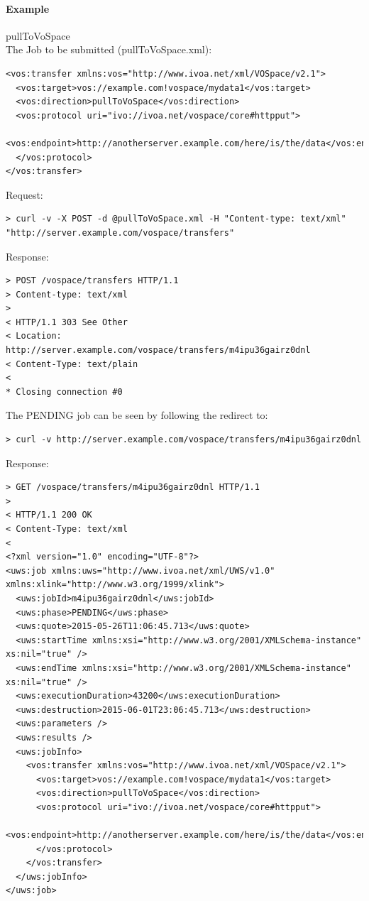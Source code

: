 \documentclass[11pt,a4paper]{ivoa}
\begin{document}
\paragraph{Example}
pullToVoSpace
\\[5px]
\noindent
The Job to be submitted (pullToVoSpace.xml):
\begin{lstlisting}
<vos:transfer xmlns:vos="http://www.ivoa.net/xml/VOSpace/v2.1">
  <vos:target>vos://example.com!vospace/mydata1</vos:target>
  <vos:direction>pullToVoSpace</vos:direction>
  <vos:protocol uri="ivo://ivoa.net/vospace/core#httpput">
    <vos:endpoint>http://anotherserver.example.com/here/is/the/data</vos:endpoint>
  </vos:protocol>
</vos:transfer>
\end{lstlisting}
Request:
\begin{lstlisting}
> curl -v -X POST -d @pullToVoSpace.xml -H "Content-type: text/xml" "http://server.example.com/vospace/transfers"
\end{lstlisting}
Response:
\begin{lstlisting}
> POST /vospace/transfers HTTP/1.1
> Content-type: text/xml
>
< HTTP/1.1 303 See Other
< Location: http://server.example.com/vospace/transfers/m4ipu36gairz0dnl
< Content-Type: text/plain
<
* Closing connection #0
\end{lstlisting}
The PENDING job can be seen by following the redirect to:
\begin{lstlisting}
> curl -v http://server.example.com/vospace/transfers/m4ipu36gairz0dnl
\end{lstlisting}
Response:
\begin{lstlisting}
> GET /vospace/transfers/m4ipu36gairz0dnl HTTP/1.1
>
< HTTP/1.1 200 OK
< Content-Type: text/xml
<
<?xml version="1.0" encoding="UTF-8"?>
<uws:job xmlns:uws="http://www.ivoa.net/xml/UWS/v1.0" xmlns:xlink="http://www.w3.org/1999/xlink">
  <uws:jobId>m4ipu36gairz0dnl</uws:jobId>
  <uws:phase>PENDING</uws:phase>
  <uws:quote>2015-05-26T11:06:45.713</uws:quote>
  <uws:startTime xmlns:xsi="http://www.w3.org/2001/XMLSchema-instance" xs:nil="true" />
  <uws:endTime xmlns:xsi="http://www.w3.org/2001/XMLSchema-instance" xs:nil="true" />
  <uws:executionDuration>43200</uws:executionDuration>
  <uws:destruction>2015-06-01T23:06:45.713</uws:destruction>
  <uws:parameters />
  <uws:results />
  <uws:jobInfo>
    <vos:transfer xmlns:vos="http://www.ivoa.net/xml/VOSpace/v2.1">
      <vos:target>vos://example.com!vospace/mydata1</vos:target>
      <vos:direction>pullToVoSpace</vos:direction>
      <vos:protocol uri="ivo://ivoa.net/vospace/core#httpput">
        <vos:endpoint>http://anotherserver.example.com/here/is/the/data</vos:endpoint>
      </vos:protocol>
    </vos:transfer>
  </uws:jobInfo>
</uws:job>
\end{lstlisting}
\end{document}

